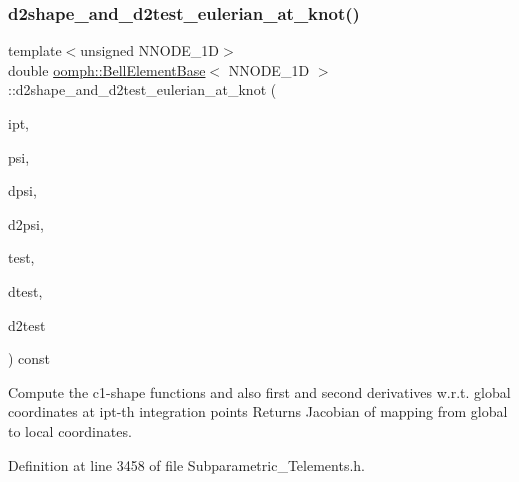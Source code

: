 \subsubsection{\texorpdfstring{d2shape\+\_\+and\+\_\+d2test\+\_\+eulerian\+\_\+at\+\_\+knot()}{d2shape\_and\_d2test\_eulerian\_at\_knot()}}
{\footnotesize\ttfamily template$<$unsigned N\+N\+O\+D\+E\+\_\+1D$>$ \\
double \hyperlink{classoomph_1_1BellElementBase}{oomph\+::\+Bell\+Element\+Base}$<$ N\+N\+O\+D\+E\+\_\+1D $>$\+::d2shape\+\_\+and\+\_\+d2test\+\_\+eulerian\+\_\+at\+\_\+knot (\begin{DoxyParamCaption}\item[{const unsigned \&}]{ipt,  }\item[{\hyperlink{classoomph_1_1Shape}{Shape} \&}]{psi,  }\item[{\hyperlink{classoomph_1_1DShape}{D\+Shape} \&}]{dpsi,  }\item[{\hyperlink{classoomph_1_1DShape}{D\+Shape} \&}]{d2psi,  }\item[{\hyperlink{classoomph_1_1Shape}{Shape} \&}]{test,  }\item[{\hyperlink{classoomph_1_1DShape}{D\+Shape} \&}]{dtest,  }\item[{\hyperlink{classoomph_1_1DShape}{D\+Shape} \&}]{d2test }\end{DoxyParamCaption}) const\hspace{0.3cm}{\ttfamily [inline]}}



Compute the c1-\/shape functions and also first and second derivatives w.\+r.\+t. global coordinates at ipt-\/th integration points Returns Jacobian of mapping from global to local coordinates. 



Definition at line 3458 of file Subparametric\+\_\+\+Telements.\+h.

\mbox{\label{classoomph_1_1BellElementBase_ae576f35c4faeeed475dff67a8b31ac37}} 
